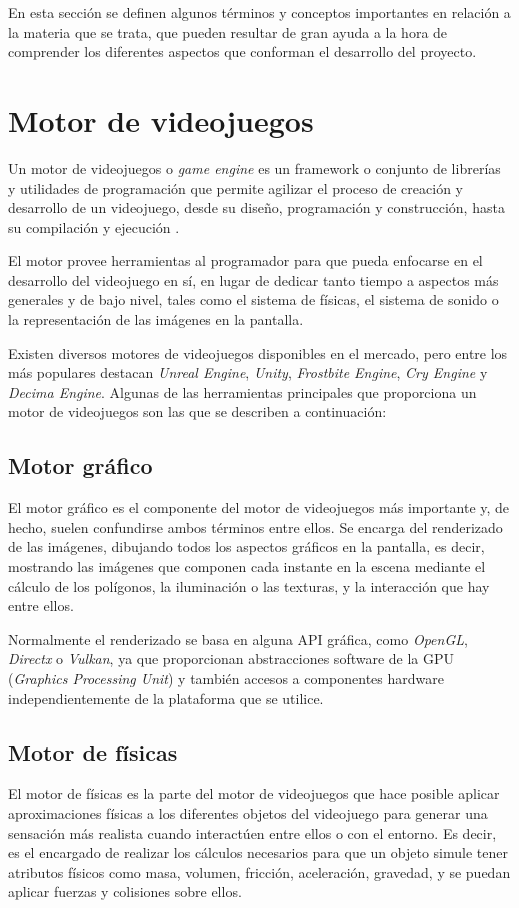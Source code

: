  \label{Conceptos teóricos}
En esta sección se definen algunos términos y conceptos importantes en relación a la materia que se trata, que pueden resultar de gran ayuda a la hora de comprender los diferentes aspectos que conforman el desarrollo del proyecto.
\section{Motor de videojuegos}
Un motor de videojuegos o \textit{game engine} es un framework o conjunto de librerías y utilidades de programación que permite agilizar el proceso de creación y desarrollo de un videojuego, desde su diseño, programación y construcción, hasta su compilación y ejecución \cite{wiki:motor_de_videojuegos}.

El motor provee herramientas al programador para que pueda enfocarse en el desarrollo del videojuego en sí, en lugar de dedicar tanto tiempo a aspectos más generales y de bajo nivel, tales como el sistema de físicas, el sistema de sonido o la representación de las imágenes en la pantalla.

Existen diversos motores de videojuegos disponibles en el mercado, pero entre los más populares destacan \textit{Unreal Engine}, \textit{Unity}, \textit{Frostbite Engine}, \textit{Cry Engine} y \textit{Decima Engine}.
Algunas de las herramientas principales que proporciona un motor de videojuegos son las que se describen a continuación:
\subsection{Motor gráfico}
El motor gráfico es el componente del motor de videojuegos más importante y, de hecho, suelen confundirse ambos términos entre ellos. Se encarga del renderizado de las imágenes, dibujando todos los aspectos gráficos en la pantalla, es decir, mostrando las imágenes que componen cada instante en la escena mediante el cálculo de los polígonos, la iluminación o las texturas, y la interacción que hay entre ellos. 

Normalmente el renderizado se basa en alguna API gráfica, como \textit{OpenGL}, \textit{Directx} o \textit{Vulkan}, ya que proporcionan abstracciones software de la GPU (\textit{Graphics Processing Unit}) y también accesos a componentes hardware independientemente de la plataforma que se utilice.
\subsection{Motor de físicas}
El motor de físicas es la parte del motor de videojuegos que hace posible aplicar aproximaciones físicas a los diferentes objetos del videojuego para generar una sensación más realista cuando interactúen entre ellos o con el entorno. Es decir, es el encargado de realizar los cálculos necesarios para que un objeto simule tener atributos físicos como masa, volumen, fricción, aceleración, gravedad, y se puedan aplicar fuerzas y colisiones sobre ellos.
